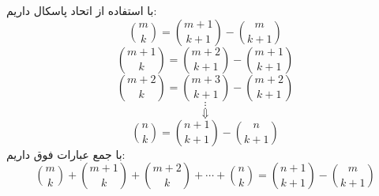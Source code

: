\p
با استفاده از اتحاد پاسکال داریم:
 \p
$$\binom{m}{k} = \binom{m + 1}{k + 1} - \binom{m}{k + 1}$$
$$\binom{m + 1}{k} = \binom{m + 2}{k + 1} - \binom{m + 1}{k + 1}$$
$$\binom{m + 2}{k} = \binom{m + 3}{k + 1} - \binom{m + 2}{k + 1}$$
$$\vdots$$
$$\Downarrow$$
$$\binom{n}{k} = \binom{n + 1}{k + 1} - \binom{n}{k + 1}$$
با جمع عبارات فوق داریم:
$$\binom{m}{k} + \binom{m + 1}{k} + \binom{m + 2}{k} + \cdots + \binom{n}{k} = \binom{n + 1}{k + 1} - \binom{m}{k + 1}$$